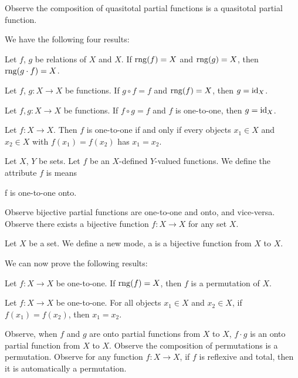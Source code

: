\documentclass{article}
\begin{document}
Observe the composition of quasitotal partial functions is a quasitotal
partial function.

We have the following four results:
\begin{thm}
\item\label{funct2:53} Let $f$, $g$ be relations of $X$ and $X$.
  If $\operatorname{rng}(f)=X$ and $\operatorname{rng}(g)=X$, then $\operatorname{rng}(g\cdot f)=X$.
\item\label{funct2:54} Let $f$, $g\colon X\to X$ be functions.
  If $g\circ  f=f$ and $\operatorname{rng}(f)=X$,
  then $g=\operatorname{id}_{X}$.
\item\label{funct2:55} Let $f,g\colon X\to X$ be functions.
  If $f\circ g=f$ and $f$ is one-to-one,
  then $g=\operatorname{id}_{X}$.
\item\label{funct2:56} Let $f\colon X\to X$.
  Then $f$ is one-to-one if and only if every objects $x_{1}\in X$ and
  $x_{2}\in X$ with $f(x_{1})=f(x_{2})$ has $x_{1}=x_{2}$.
\end{thm}

\begin{definition}
Let $X$, $Y$ be sets. Let $f$ be an $X$-defined $Y$-valued functions.
We define the attribute $f$ is  means
\begin{defn}
\item f is one-to-one onto.
\end{defn}
\end{definition}

Observe bijective partial functions are one-to-one and onto, and vice-versa.
Observe there exists a bijective function $f\colon X\to X$ for any set
$X$.

\begin{definition}
Let $X$ be a set.
We define a new mode, a  is a bijective
function from $X$ to $X$.
\end{definition}

We can now prove the following results:
\begin{thm}
\item\label{funct2:57} Let $f\colon X\to X$ be one-to-one.
  If $\operatorname{rng}(f)=X$, then $f$ is a permutation of $X$.
\item\label{funct2:58} Let $f\colon X\to X$ be one-to-one.
  For all objects $x_{1}\in X$ and $x_{2}\in X$, if $f(x_{1})=f(x_{2})$,
  then $x_{1}=x_{2}$.
\end{thm}

Observe, when $f$ and $g$ are onto partial functions from $X$ to $X$,
$f\cdot g$ is an onto partial function from $X$ to $X$.
Observe the composition of permutations is a permutation.
Observe for any function $f\colon X\to X$, if $f$ is reflexive and
total, then it is automatically a permutation.
\end{document}
